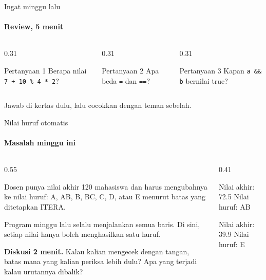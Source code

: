 \documentclass[t]{beamer}
\begin{document}
\begin{frame}{Ingat minggu lalu}
\framesubtitle{Review, 5 menit}
\begin{columns}[T]
\begin{column}{0.31\textwidth}
\begin{BlokGelap}{Pertanyaan 1}
Berapa nilai \texttt{7 + 10 \% 4 * 2}?
\end{BlokGelap}
\end{column}
\begin{column}{0.31\textwidth}
\begin{BlokGelap}{Pertanyaan 2}
Apa beda \texttt{=} dan \texttt{==}?
\end{BlokGelap}
\end{column}
\begin{column}{0.31\textwidth}
\begin{BlokGelap}{Pertanyaan 3}
Kapan \texttt{a \&\& b} bernilai true?
\end{BlokGelap}
\end{column}
\end{columns}
\vspace{8pt}
Jawab di kertas dulu, lalu cocokkan dengan teman sebelah.
\end{frame}


\begin{frame}[fragile]{Nilai huruf otomatis}
\framesubtitle{Masalah minggu ini}
\begin{columns}[T]
\begin{column}{0.55\textwidth}
{Dosen punya nilai akhir 120 mahasiswa dan harus mengubahnya ke nilai huruf: A, AB, B, BC, C, D, atau E menurut batas yang ditetapkan ITERA.

\vspace{6pt}
Program minggu lalu selalu menjalankan semua baris. Di sini, setiap nilai hanya boleh menghasilkan satu huruf.\par}
\vspace{6pt}
\begin{Catatan}
\textbf{Diskusi 2 menit.} Kalau kalian mengecek dengan tangan, batas mana yang kalian periksa lebih dulu? Apa yang terjadi kalau urutannya dibalik?
\end{Catatan}
\end{column}
\begin{column}{0.41\textwidth}
\begin{Keluaran}[]
Nilai akhir: 72.5
Nilai huruf: AB

Nilai akhir: 39.9
Nilai huruf: E
\end{Keluaran}
\end{column}
\end{columns}
\end{frame}
\end{document}
